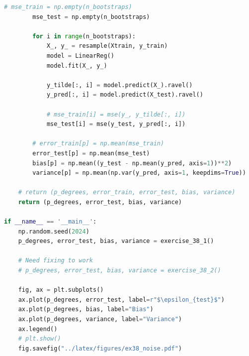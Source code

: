 \begin{lstlisting}[language=Python]
        # mse_train = np.empty(n_bootstraps)
        mse_test = np.empty(n_bootstraps)

        for i in range(n_bootstraps):
            X_, y_ = resample(Xtrain, y_train)
            model = LinearReg()
            model.fit(X_, y_)

            y_tilde[:, i] = model.predict(X_).ravel()
            y_pred[:, i] = model.predict(X_test).ravel()

            # mse_train[i] = mse(y_, y_tilde[:, i])
            mse_test[i] = mse(y_test, y_pred[:, i])

        # error_train[p] = np.mean(mse_train)
        error_test[p] = np.mean(mse_test)
        bias[p] = np.mean((y_test - np.mean(y_pred, axis=1))**2)
        variance[p] = np.mean(np.var(y_pred, axis=1, keepdims=True))

    # return (p_degrees, error_train, error_test, bias, variance)
    return (p_degrees, error_test, bias, variance)

if __name__ == '__main__':
    np.random.seed(2024)
    p_degrees, error_test, bias, variance = exercise_38_1()

    # Need fixing to work
    # p_degrees, error_test, bias, variance = exercise_38_2()

    fig, ax = plt.subplots()
    ax.plot(p_degrees, error_test, label=r"$\epsilon_{test}$")
    ax.plot(p_degrees, bias, label="Bias")
    ax.plot(p_degrees, variance, label="Variance")
    ax.legend()
    # plt.show()
    fig.savefig("../latex/figures/ex38_noise.pdf")
\end{lstlisting}
